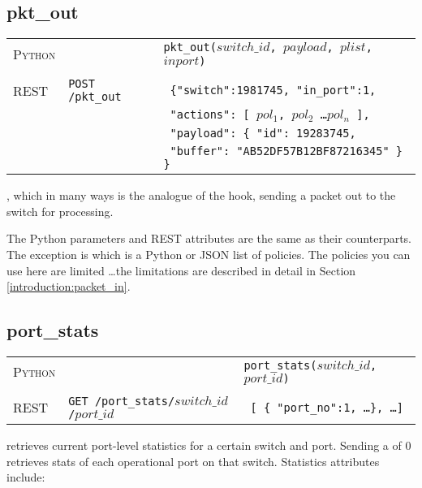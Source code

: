 \subsection{pkt\_out}

\bigskip
\begin{tabularx}{\linewidth}{llX}
\textsc{Python} &  & \texttt{pkt\_out($switch\_id$, $payload$, $plist$, $inport$)} \\ \\
\textsc{REST} & \texttt{POST /pkt\_out} & 
  \texttt{ \{"switch":1981745, "in\_port":1, } \\
  & & \texttt{ "actions": [ $pol_1$, $pol_2$ \ldots $pol_n$ ], } \\ 
  & & \texttt{ "payload": \{ "id": 19283745, }\\
  & & \texttt{ "buffer": "AB52DF57B12BF87216345" \} \} } 
\end{tabularx}

, which in many ways is the analogue of the  hook, sending a packet
out to the switch for processing. 

The Python parameters and REST attributes are the same as their  counterparts.
The exception is  which is a Python or JSON list of policies.  The policies you can
use here are limited \ldots the limitations are described in detail in Section \ref{introduction:packet_in}.  

\subsection{port\_stats}

\bigskip
\begin{tabularx}{\linewidth}{llX}
\textsc{Python} &  & \texttt{port\_stats($switch\_id$, $port\_id$)} \\ \\
\textsc{REST} & \texttt{GET /port\_stats/$switch\_id$/$port\_id$} & 
  \texttt{ [ \{ "port\_no":1, \ldots \}, \ldots ] } 
\end{tabularx}

 retrieves current port-level statistics for a certain switch and port.  Sending a 
 of 0 retrieves stats of each operational port on that switch.   Statistics attributes
include:


